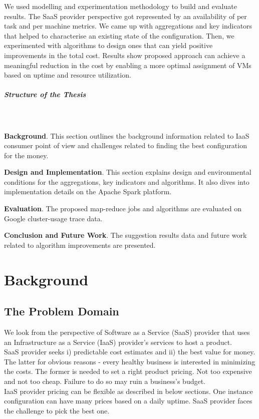 \documentclass[]{final_report}
\newcommand{\myparagraph}[1]{\paragraph{#1}\mbox{}\\}
\begin{document}

We used modelling and experimentation methodology to build and evaluate results. The SaaS provider perspective got represented by an availability of per task and per machine metrics. We came up with aggregations and key indicators that helped to characterise an existing state of the configuration. Then, we experimented with algorithms to design ones that can yield positive improvements in the total cost.
Results show proposed approach can achieve a meaningful reduction in the cost by enabling a more optimal assignment of VMs based on uptime and resource utilization. 

\myparagraph{Structure of the Thesis}\\
\textbf{Background}. This section outlines the background information related to IaaS consumer point of view and challenges related to finding the best configuration for the money. \par
\textbf{Design and Implementation}. This section explains design and environmental conditions for the aggregations, key indicators and algorithms. It also dives into implementation details on the Apache Spark platform. \par
\textbf{Evaluation}. The proposed map-reduce jobs and algorithms are evaluated on Google cluster-usage trace data. \par
\textbf{Conclusion and Future Work}. The suggestion results data and future work related to algorithm improvements are presented. 
 
\newpage


\chapter{Background}

\section{The Problem Domain} 

We look from the perspective of Software as a Service (SaaS) provider that uses an Infrastructure as a Service (IaaS) provider's services to host a product. \\
SaaS provider seeks i) predictable cost estimates and ii) the best value for money. The latter for obvious reasons - every healthy business is interested in minimizing the costs. The former is needed to set a right product pricing. Not too expensive and not too cheap. Failure to do so may ruin a business's budget. \\
IaaS provider pricing can be flexible as described in below sections. One instance configuration can have many prices based on a daily uptime. SaaS provider faces the challenge to pick the best one.
\end{document}
